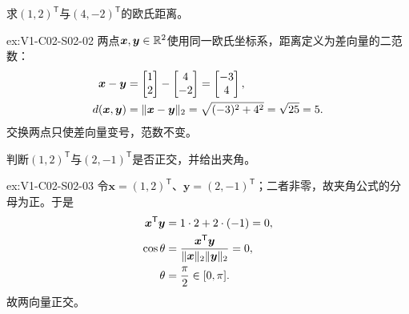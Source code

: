 \begin{SLChapterExercisePairSection}
\begin{exercise}[距离]\label{ex:V1-C02-S02-02}
求$(1,2)^{\mathsf T}$与$(4,-2)^{\mathsf T}$的欧氏距离。
\end{exercise}
\label{sol:V1-C02-S02-02}
\begin{chapterexercisesolution}{ex:V1-C02-S02-02}
两点$\boldsymbol{x},\boldsymbol{y}\in\mathbb{R}^2$使用同一欧氏坐标系，距离定义为差向量的二范数：
\[
\begin{aligned}
\boldsymbol{x}-\boldsymbol{y}
&=\begin{bmatrix}1\\2\end{bmatrix}-\begin{bmatrix}4\\-2\end{bmatrix}
=\begin{bmatrix}-3\\4\end{bmatrix},\\
d(\boldsymbol{x},\boldsymbol{y})
&=\lVert\boldsymbol{x}-\boldsymbol{y}\rVert_2
=\sqrt{(-3)^2+4^2}=\sqrt{25}=5.
\end{aligned}
\]
交换两点只使差向量变号，范数不变。
\end{chapterexercisesolution}

\begin{exercise}[夹角与正交]\label{ex:V1-C02-S02-03}
判断$(1,2)^{\mathsf T}$与$(2,-1)^{\mathsf T}$是否正交，并给出夹角。
\end{exercise}
\label{sol:V1-C02-S02-03}
\begin{chapterexercisesolution}{ex:V1-C02-S02-03}
令$\boldsymbol{x}=(1,2)^{\mathsf T}$、$\boldsymbol{y}=(2,-1)^{\mathsf T}$；二者非零，故夹角公式的分母为正。于是
\[
\begin{aligned}
\boldsymbol{x}^{\mathsf T}\boldsymbol{y}
&=1\cdot2+2\cdot(-1)=0,\\
\cos\theta
&=\frac{\boldsymbol{x}^{\mathsf T}\boldsymbol{y}}
{\lVert\boldsymbol{x}\rVert_2\lVert\boldsymbol{y}\rVert_2}=0,\\
\theta&=\frac{\pi}{2}\in[0,\pi].
\end{aligned}
\]
故两向量正交。
\end{chapterexercisesolution}


\end{SLChapterExercisePairSection}
